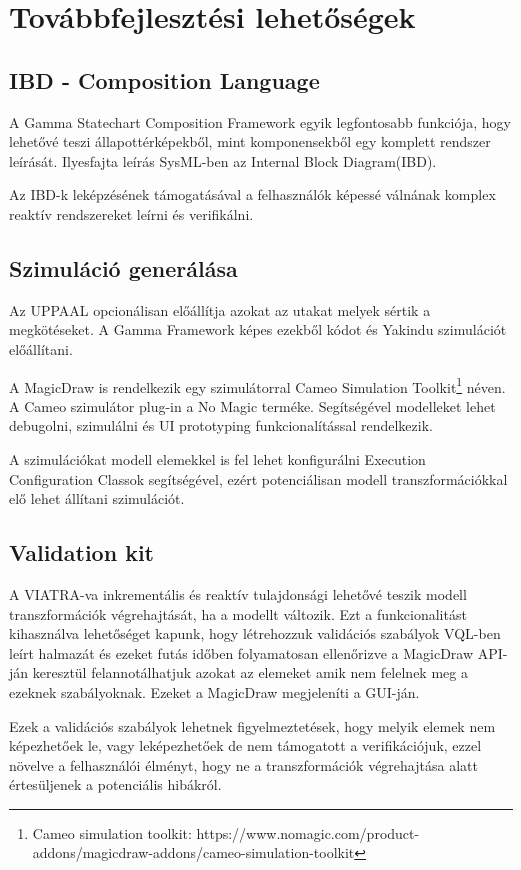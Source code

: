 \chapter{Továbbfejlesztési lehetőségek}
\label{chap:jovoben}
\section{IBD - Composition Language}
A Gamma Statechart Composition Framework egyik legfontosabb funkciója, hogy lehetővé teszi állapottérképekből, mint komponensekből egy komplett rendszer leírását. Ilyesfajta leírás SysML-ben az Internal Block Diagram(IBD).

Az IBD-k leképzésének támogatásával a felhasználók képessé válnának komplex reaktív rendszereket leírni és verifikálni.

\section{Szimuláció generálása}

Az UPPAAL opcionálisan előállítja azokat az utakat melyek sértik a megkötéseket. A Gamma Framework képes ezekből kódot és Yakindu szimulációt előállítani.

A MagicDraw is rendelkezik egy szimulátorral Cameo Simulation Toolkit\footnote{Cameo simulation toolkit: https://www.nomagic.com/product-addons/magicdraw-addons/cameo-simulation-toolkit} néven. A Cameo szimulátor plug-in a No Magic terméke. Segítségével modelleket lehet debugolni, szimulálni és UI prototyping funkcionalítással rendelkezik.

A szimulációkat modell elemekkel is fel lehet konfigurálni Execution Configuration Classok segítségével, ezért potenciálisan modell transzformációkkal elő lehet állítani szimulációt.

\section{Validation kit}

A VIATRA-va inkrementális és reaktív tulajdonsági lehetővé teszik modell transzformációk végrehajtását, ha a modellt változik. Ezt a funkcionalitást kihasználva lehetőséget kapunk, hogy létrehozzuk validációs szabályok VQL-ben leírt halmazát és ezeket futás időben folyamatosan ellenőrizve a MagicDraw API-ján keresztül felannotálhatjuk azokat az elemeket amik nem felelnek meg a ezeknek szabályoknak. Ezeket a MagicDraw megjeleníti a GUI-ján.

Ezek a validációs szabályok lehetnek figyelmeztetések, hogy melyik elemek nem képezhetőek le, vagy leképezhetőek de nem támogatott a verifikációjuk, ezzel növelve a felhasználói élményt, hogy ne a transzformációk végrehajtása alatt értesüljenek a potenciális hibákról.




